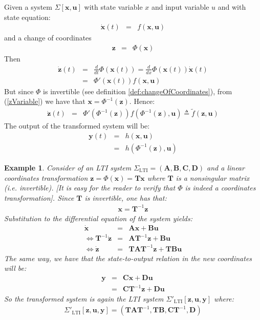 \documentclass[a4paper,10pt,oneside]{book}
\newtheorem{example}{Example}
\begin{document}
Given a system $\Sigma[\mathbf{x},\mathbf{u}]$ with state variable $x$ and input variable $u$ and with state equation:
\begin{eqnarray}
 \dot{\mathbf{x}}(t)&=&f(\mathbf{x},\mathbf{u})
\end{eqnarray}
and a change of coordinates 
\begin{eqnarray}\label{zVariable}
 \mathbf{z}&=&\Phi(\mathbf{x})
\end{eqnarray}
Then 
\begin{eqnarray}
 \dot{\mathbf{z}}(t)&=&\frac{d}{dt}\Phi(\mathbf{x}(t))=\frac{d}{dx}\Phi(\mathbf{x}(t))\dot{\mathbf{x}}(t)\\
                    &=&\Phi'(\mathbf{x}(t))f(\mathbf{x},\mathbf{u})
\end{eqnarray}
But since $\Phi$ is invertible (see definition \ref{def:changeOfCoordinates}), from (\ref{zVariable}) we have that $\mathbf{x}=\Phi^{-1}(\mathbf{z})$. Hence:
\begin{eqnarray}
 \dot{\mathbf{z}}(t)&=&\Phi'(\Phi^{-1}(\mathbf{z}))f(\Phi^{-1}(\mathbf{z}),\mathbf{u})\triangleq \tilde{f}(\mathbf{z},\mathbf{u})\label{diffEqTransformed}
\end{eqnarray}
The output of the transformed system will be:
\begin{eqnarray}
 \mathbf{y}(t)&=&h(\mathbf{x},\mathbf{u})\nonumber\\
              &=&h(\Phi^{-1}(\mathbf{z}),\mathbf{u})\label{outputTransformed}
\end{eqnarray}
\begin{example}
 Consider of an LTI system $\Sigma_{\text{LTI}}=\left( \mathbf{A},\mathbf{B},\mathbf{C},\mathbf{D}\right)$ and a linear coordinates transformation $\mathbf{z}=\Phi(\mathbf{x})=\mathbf{Tx}$ where $\mathbf{T}$ is a nonsingular matrix (i.e. invertible). [It is easy for the reader to verify that $\Phi$ is indeed a coordinates transformation]. Since $\mathbf{T}$ is invertible, one has that:
\begin{eqnarray}
 \mathbf{x}=\mathbf{T}^{-1}\mathbf{z}
\end{eqnarray}
Substitution to the differential equation of the system yields:
\begin{eqnarray}
 \dot{\mathbf{x}}&=&\mathbf{Ax}+\mathbf{Bu}  \\
 \Leftrightarrow \mathbf{T}^{-1}\dot{\mathbf{z}} &=& \mathbf{AT}^{-1}\mathbf{z}+\mathbf{Bu} \\
\Leftrightarrow \dot{\mathbf{z}} &=& \mathbf{TAT}^{-1}\mathbf{z}+\mathbf{TBu}
\end{eqnarray}
The same way, we have that the state-to-output relation in the new coordinates will be:
\begin{eqnarray}
 \mathbf{y}&=&\mathbf{Cx}+\mathbf{Du}  \\
 &=& \mathbf{CT}^{-1}\mathbf{z}+\mathbf{Du}
\end{eqnarray}
So the transformed system is again the LTI system $\Sigma'_{\text{LTI}}[\mathbf{z},\mathbf{u},\mathbf{y}]$ where:
\begin{eqnarray}
\Sigma'_{\text{LTI}}[\mathbf{z},\mathbf{u},\mathbf{y}]=(\mathbf{TAT}^{-1},\mathbf{TB},\mathbf{CT}^{-1},\mathbf{D}) 
\end{eqnarray}
\end{example}
\end{document}

